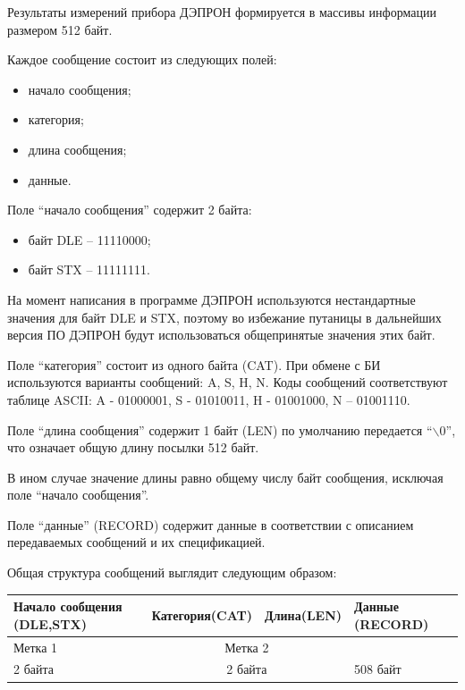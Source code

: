 Результаты измерений прибора ДЭПРОН формируется в массивы информации размером 512 байт.


Каждое сообщение состоит из следующих полей:

\begin{itemize}
	\item  начало сообщения;

	\item  категория;

	\item  длина сообщения;

	\item  данные.
\end{itemize}


Поле {``}начало сообщения'' содержит 2 байта:
\begin{itemize}
	\item байт DLE -- 11110000;
	\item байт STX -- 11111111.
\end{itemize}


На момент написания в программе ДЭПРОН используются нестандартные значения для байт DLE и STX, поэтому во избежание путаницы в дальнейших версия ПО ДЭПРОН будут использоваться общепринятые значения этих байт.


Поле ``категория'' состоит из одного байта (CAT). При обмене с БИ используются варианты сообщений: A, S, H, N. Коды сообщений соответствуют таблице ASCII: A - 01000001, S - 01010011, H - 01001000, N -- 01001110.

Поле ``длина сообщения'' содержит 1 байт (LEN) по умолчанию передается ``\ensuremath{\backslash 0}'', что означает общую длину посылки 512 байт.


В ином случае значение длины равно общему числу байт сообщения, исключая поле ``начало сообщения''.


Поле ``данные'' (RECORD) содержит данные в соответствии с описанием передаваемых сообщений и их спецификацией.



Общая структура сообщений выглядит следующим образом:

\begin{tabular}{|p{4.5cm}|c|c|p{2.5cm}|}
	\hline
	Начало сообщения (DLE,STX) & Категория(CAT) & Длина(LEN)  & Данные (RECORD) \\ \hline
	Метка 1                    & \multicolumn{2}{c|}{Метка 2} &  \\ \hline
	2 байта                    & \multicolumn{2}{c|}{2 байта} & {508 байт  }    \\ \hline
\end{tabular}

